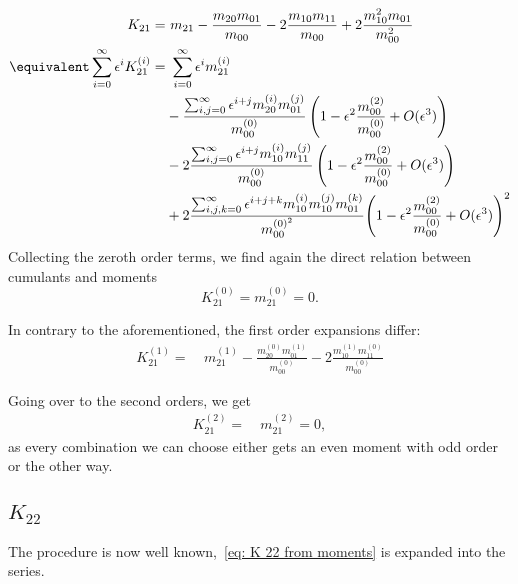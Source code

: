 \begin{equation*}
  \begin{aligned}
    K_{21} = &\ m_{21} - \frac{m_{20}m_{01}}{m_{00}}
         - 2\frac{m_{10}m_{11}}{m_{00}} + 2\frac{m_{10}^2 m_{01}}{m_{00}^2}
    \\
    \equivalent
    \sum_{i=0}^\infty \epsilon^i K_{21}^{(i)}
     = &\ \sum_{i=0}^\infty \epsilon^i m_{21}^{(i)}
    \\ &
    - \frac{\sum_{i,j=0}^\infty \epsilon^{i+j} m_{20}^{(i)} m_{01}^{(j)}}{m_{00}^{(0)}}
      \left(1 - \epsilon^2 \frac{m_{00}^{(2)}}{m_{00}^{(0)}}  + O(\epsilon^3)\right)
    \\ &
     - 2\frac{\sum_{i,j=0}^\infty \epsilon^{i+j} m_{10}^{(i)} m_{11}^{(j)}}{m_{00}^{(0)}}
      \left(1 - \epsilon^2 \frac{m_{00}^{(2)}}{m_{00}^{(0)}}  + O(\epsilon^3)\right)
     \\ &
     +
        2 \frac{\sum_{i,j,k=0}^\infty \epsilon^{i+j+k} m_{10}^{(i)} m_{10}^{(j)} m_{01}^{(k)}}{m_{00}^{{(0)}^2}}
        {
          \left(1 - \epsilon^2 \frac{m_{00}^{(2)}}{m_{00}^{(0)}}  + O(\epsilon^3)\right)
        }^2
   \end{aligned}
\end{equation*}
Collecting the zeroth order terms, we find again the direct relation between cumulants and moments
\begin{equation*}
  K_{21}^{(0)} = m_{21}^{(0)} = 0.
\end{equation*}

In contrary to the aforementioned, the first order expansions differ:
\begin{equation*}
  \begin{aligned}
    K_{21}^{(1)} = &\ m_{21}^{(1)}
    - \frac{m_{20}^{(0)} m_{01}^{(1)}}{m_{00}^{(0)}}
    - 2\frac{m_{10}^{(1)} m_{11}^{(0)}}{m_{00}^{(0)}}
  \end{aligned}
\end{equation*}

Going over to the second orders, we get
\begin{equation*}
  \begin{aligned}
    K_{21}^{(2)} = &\ m_{21}^{(2)} = 0,
  \end{aligned}
\end{equation*}
as every combination we can choose either gets an even moment with odd order or the other way.

\subsection{\texorpdfstring{$K_{22}$}{K 22}}
\label{sub: K 22}
The procedure is now well known,~\eqref{eq: K 22 from moments} is expanded into the series.

